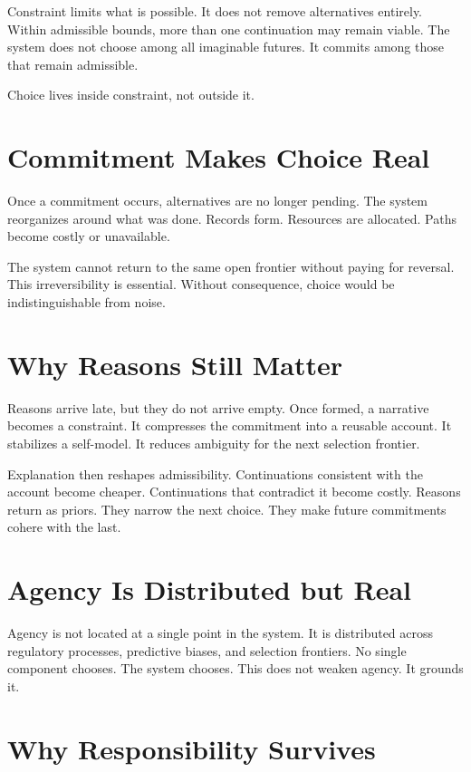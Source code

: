 \documentclass[11pt,twoside,openright]{book}
\begin{document}
Constraint limits what is possible. It does not remove alternatives entirely. Within admissible bounds, more than one continuation may remain viable. The system does not choose among all imaginable futures. It commits among those that remain admissible.

Choice lives inside constraint, not outside it.

\section*{Commitment Makes Choice Real}

Once a commitment occurs, alternatives are no longer pending. The system reorganizes around what was done. Records form. Resources are allocated. Paths become costly or unavailable.

The system cannot return to the same open frontier without paying for reversal. This irreversibility is essential. Without consequence, choice would be indistinguishable from noise.

\section*{Why Reasons Still Matter}

Reasons arrive late, but they do not arrive empty. Once formed, a narrative becomes a constraint. It compresses the commitment into a reusable account. It stabilizes a self-model. It reduces ambiguity for the next selection frontier.

Explanation then reshapes admissibility. Continuations consistent with the account become cheaper. Continuations that contradict it become costly. Reasons return as priors. They narrow the next choice. They make future commitments cohere with the last.

\section*{Agency Is Distributed but Real}

Agency is not located at a single point in the system. It is distributed across regulatory processes, predictive biases, and selection frontiers. No single component chooses. The system chooses. This does not weaken agency. It grounds it.

\section*{Why Responsibility Survives}
\end{document}
